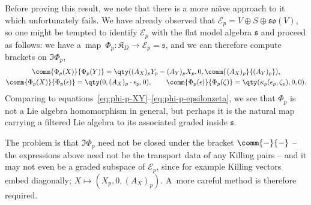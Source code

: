 \documentclass[pdftex]{sigma}
\numberwithin{equation}{section}
\newcommand{\fs}{\mathfrak{s}}
\newcommand{\fso}{\mathfrak{so}}
\newcommand{\fK}{\mathfrak{K}}
\newcommand{\eE}{\mathscr{E}}
\newcommand{\1}{\mathbbm{1}}
\begin{document}
\begin{Remark}
Before proving this result, we note that there is a more na\"{\i}ve approach to it which unfortunately fails. We have already observed that $\eE_p = V\oplus S\oplus\fso(V)$, so one might be tempted to identify $\eE_p$ with the flat model algebra $\fs$ and proceed as follows: we have a~map~${\Phi_p\colon \fK_D\to \eE_p=\fs}$, and we can therefore compute brackets on $\Im\Phi_p$,
\begin{gather*}
	\comm{\Phi_p(X)}{\Phi_p(Y)}
		= \qty((A_X)_p Y_p - (A_Y)_p X_p,0,\comm{(A_X)_p}{(A_Y)_p}),\\
	\comm{\Phi_p(X)}{\Phi_p(\epsilon)}
		= \qty(0,(A_X)_p\cdot\epsilon_p,0),\qquad
	\comm{\Phi_p(\epsilon)}{\Phi_p(\zeta)}
		= \qty(\kappa_p(\epsilon_p,\zeta_p),0,0).
\end{gather*}
Comparing to equations~\eqref{eq:phi-p-XY}--\eqref{eq:phi-p-epsilonzeta}, we see that $\Phi_p$ is not a Lie algebra homomorphism in general, but perhaps it is the natural map carrying a filtered Lie algebra to its associated graded inside $\fs$.

The problem is that $\Im\Phi_p$ need not be closed under the bracket $\comm{-}{-}$ -- the expressions above need not be the transport data of any Killing pairs -- and it may not even be a graded subspace of $\eE_p$, since for example Killing vectors embed diagonally; $X\mapsto(X_p,0,(A_X)_p)$. A~more careful method is therefore required.
\end{Remark}
\end{document}
